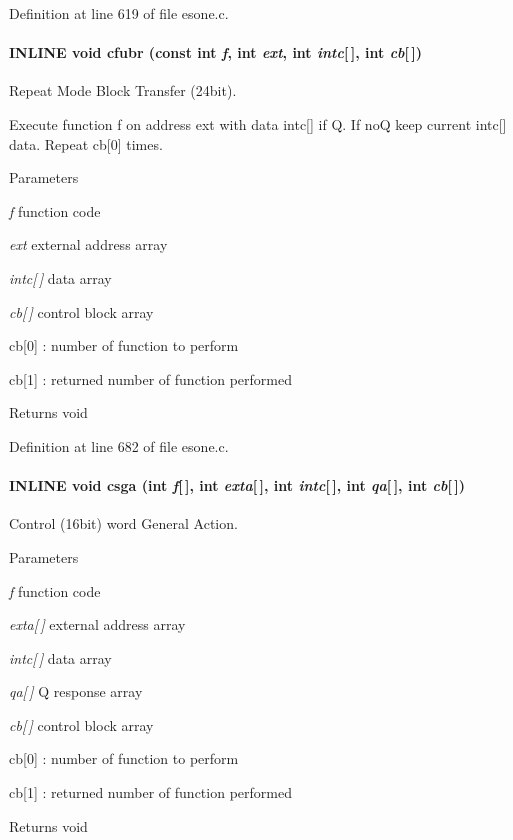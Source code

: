 Definition at line 619 of file esone.c.
\paragraph[{cfubr}]{\setlength{\rightskip}{0pt plus 5cm}INLINE void cfubr (const int {\em f}, \/  int {\em ext}, \/  int {\em intc}\mbox{[}$\,$\mbox{]}, \/  int {\em cb}\mbox{[}$\,$\mbox{]})}\hfill\label{esone_8c_a68a5e8b8598e4420f19e69c5bd76b8c8}
Repeat Mode Block Transfer (24bit).

Execute function f on address ext with data intc\mbox{[}\mbox{]} if Q. If noQ keep current intc\mbox{[}\mbox{]} data. Repeat cb\mbox{[}0\mbox{]} times.


\begin{DoxyParams}{Parameters}
\item[{\em f}]function code \item[{\em ext}]external address array \item[{\em intc\mbox{[}$\,$\mbox{]}}]data array \item[{\em cb\mbox{[}$\,$\mbox{]}}]control block array \par
 cb\mbox{[}0\mbox{]} : number of function to perform \par
 cb\mbox{[}1\mbox{]} : returned number of function performed \end{DoxyParams}
\begin{DoxyReturn}{Returns}
void 
\end{DoxyReturn}


Definition at line 682 of file esone.c.
\paragraph[{csga}]{\setlength{\rightskip}{0pt plus 5cm}INLINE void csga (int {\em f}\mbox{[}$\,$\mbox{]}, \/  int {\em exta}\mbox{[}$\,$\mbox{]}, \/  int {\em intc}\mbox{[}$\,$\mbox{]}, \/  int {\em qa}\mbox{[}$\,$\mbox{]}, \/  int {\em cb}\mbox{[}$\,$\mbox{]})}\hfill\label{esone_8c_a2f2569deffeebd1016751ac662d2543d}
Control (16bit) word General Action.


\begin{DoxyParams}{Parameters}
\item[{\em f}]function code \item[{\em exta\mbox{[}$\,$\mbox{]}}]external address array \item[{\em intc\mbox{[}$\,$\mbox{]}}]data array \item[{\em qa\mbox{[}$\,$\mbox{]}}]Q response array \item[{\em cb\mbox{[}$\,$\mbox{]}}]control block array \par
 cb\mbox{[}0\mbox{]} : number of function to perform\par
 cb\mbox{[}1\mbox{]} : returned number of function performed \end{DoxyParams}
\begin{DoxyReturn}{Returns}
void 
\end{DoxyReturn}


